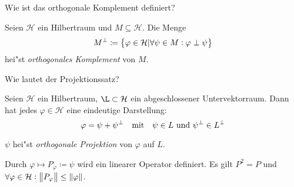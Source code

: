 \documentclass[9pt]{article}
\newcommand{\Hi}{\mathcal{H}}
\newenvironment{field}{}{\newpage}
\newif\ifnote
\newenvironment{note}{\notetrue}{\notefalse}
\newcommand{\localtag}{}
\newcommand{\globaltag}{}
\newcommand{\uuid}{}
\newcommand{\tags}[1]{
    \ifnote 
        \renewcommand{\localtag}{#1}
    \else
        \renewcommand{\globaltag}{#1}
    \fi 
    }
\newcommand{\xplain}[1]{\renewcommand{\uuid}{#1}}
\begin{document}
	\begin{note}
		\xplain{ceabc1dc-0f77-450a-8523-3235056376fc}
		\tags{definition, satz, 5.2.11, 5.2.12}
			
		\begin{field}  %
			Wie ist das orthogonale Komplement definiert?
		\end{field}
		
		\begin{field}  %
			Seien $\Hi$ ein Hilbertraum und $M \subseteq \Hi$. Die Menge 
			\begin{equation*}
				M^\perp \coloneqq \qty{\varphi \in \Hi| \forall \psi \in M: \varphi \perp \psi}
			\end{equation*} 
			hei"st \textit{orthogonales Komplement} von $M$.
		\end{field}
			
		\begin{field}  %
			Wie lautet der Projektionssatz?
		\end{field}
		
		\begin{field}  %
			Seien $\Hi$ ein Hilbertraum, $\L\subset \Hi$ ein abgeschlossener Untervektorraum. Dann hat jedes $\varphi \in \Hi$ eine eindeutige Darstellung:
			\begin{equation*}
				\varphi = \psi + \psi^\perp \qq{mit} \psi \in L \text{ und } \psi^\perp \in L^\perp
			\end{equation*}
			
			$\psi$ hei"st \textit{orthogonale Projektion} von $\varphi$ auf $L$. 
			
			Durch $\varphi \mapsto P_\varphi \coloneqq \psi$ wird ein linearer Operator definiert. Es gilt $P^2=P$ und $\forall \varphi \in \Hi: \norm{P_\varphi} \leq \norm{\varphi}$.
		\end{field}
	\end{note}
\end{document}
